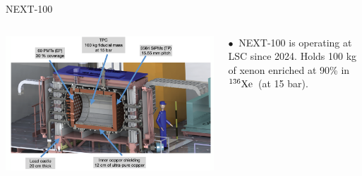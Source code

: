 \documentclass [aspectratio=169]{beamer}
\newcommand{\XE}{\ensuremath{{}^{136}{\rm Xe}}}
\begin{document}
\begin{frame}{NEXT-100}

\begin{columns}
\includegraphics[scale=0.24]{next100withcastle.png}


$\bullet~$ NEXT-100 is operating at LSC since 2024. Holds 100 kg of xenon enriched at 90\% in \XE\ (at 15 bar). 

\end{columns}
\end{frame}
\end{document}
